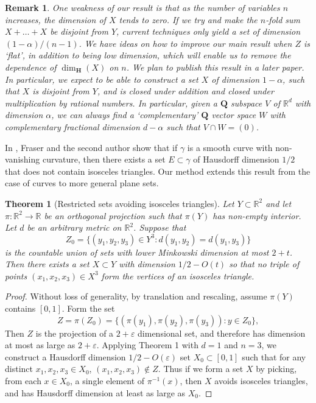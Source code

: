 \documentclass[usenames,dvipsnames,letterpaper, reqno,11pt]{article}
\theoremstyle{plain}
\theoremstyle{plain}
\newtheorem{theorem}{Theorem}
\newtheorem*{remark}{Remark}
\newcommand{\RR}{\mathbb{R}}
\begin{document}
\begin{remark}
	One weakness of our result is that as the number of variables $n$ increases, the dimension of $X$ tends to zero. If we try and make the $n$-fold sum $X + \dots + X$ be disjoint from $Y$, current techniques only yield a set of dimension $(1 - \alpha)/(n-1)$. We have ideas on how to improve our main result when $Z$ is `flat', in addition to being low dimension, which will enable us to remove the dependence of $\dim_{\mathbf{H}}(X)$ on $n$. We plan to publish this result in a later paper. In particular, we expect to be able to construct a set $X$ of dimension $1 - \alpha$, such that $X$ is disjoint from $Y$, and is closed under addition and closed under multiplication by rational numbers. In particular, given a $\mathbf{Q}$ subspace $V$ of $\RR^d$ with dimension $\alpha$, we can always find a `complementary' $\mathbf{Q}$ vector space $W$ with complementary fractional dimension $d - \alpha$ such that $V \cap W = (0)$.
\end{remark}

In \cite{MalabikaRob}, Fraser and the second author show that if $\gamma$ is a smooth curve with non-vanishing curvature, then there exists a set $E\subset\gamma$ of Hausdorff dimension $1/2$ that does not contain isosceles triangles. Our method extends this result from the case of curves to more general plane sets.

\begin{theorem}[Restricted sets avoiding isosceles triangles]\label{restrictedSetsTriangles}
	Let $Y \subset \RR^2$ and let $\pi: \RR^2 \to \RR$ be an orthogonal projection such that $\pi(Y)$ has non-empty interior. Let $d$ be an arbitrary metric on $\RR^2$. Suppose that
	\[ Z_0 = \{ (y_1,y_2,y_3) \in Y^3 : d(y_1,y_2) = d(y_1,y_3) \} \]
	is the countable union of sets with lower Minkowski dimension at most $2 + t$. Then there exists a set $X\subset Y$ with dimension $1/2 - O(t)$ so that no triple of points $(x_1,x_2,x_3) \in X^3$ form the vertices of an isosceles triangle.
\end{theorem}
\begin{proof}
	Without loss of generality, by translation and rescaling, assume $\pi(Y)$ contains $[0,1]$. Form the set
	\[ Z = \pi(Z_0) = \{ (\pi(y_1), \pi(y_2), \pi(y_3)) : y \in Z_0 \}, \]
	Then $Z$ is the projection of a $2 + \varepsilon$ dimensional set, and therefore has dimension at most as large as $2 + \varepsilon$. Applying Theorem 1 with $d = 1$ and $n = 3$, we construct a Hausdorff dimension $1/2 - O(\varepsilon)$ set $X_0 \subset [0,1]$ such that for any distinct $x_1, x_2, x_3 \in X_0$, $(x_1, x_2, x_3) \not \in Z$. Thus if we form a set $X$ by picking, from each $x \in X_0$, a single element of $\pi^{-1}(x)$, then $X$ avoids isosceles triangles, and has Hausdorff dimension at least as large as $X_0$.
\end{proof}
\end{document}

